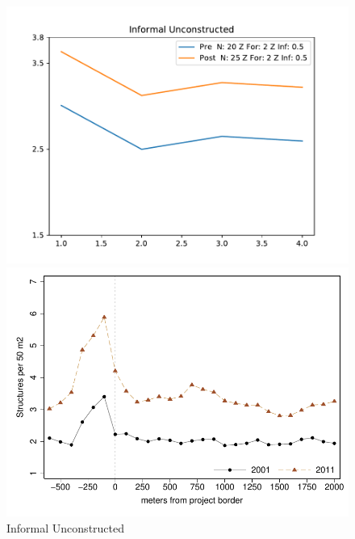 \documentclass[12pt]{article}
\begin{document}
\begin{figure}[b]
\caption{Informal Unconstructed}\label{fig3}
\centering
\begin{minipage}[b]{.4\textwidth}
\centering
\includegraphics[scale=.48]{figures/unconstructed_informal.pdf}
\end{minipage}
\begin{minipage}[b]{.4\textwidth}
\centering
\includegraphics[scale=.5]{figures/bblu_inf_placebo_admin.pdf}
\end{minipage}
\end{figure}
\end{document}

